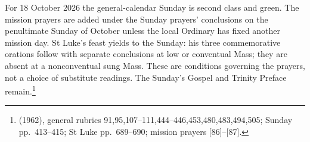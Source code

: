 For 18 October 2026 the general-calendar Sunday is second class and green.
The mission prayers are added under the Sunday prayers' conclusions on
the penultimate Sunday of October unless the local Ordinary has fixed
another mission day. St Luke's feast yields to the Sunday: his three
commemorative orations follow with separate conclusions at low or
conventual Mass; they are absent at a nonconventual sung Mass. These are
conditions governing the prayers, not a choice of substitute readings.
The Sunday's Gospel and Trinity Preface remain.\footnote{ (1962), general rubrics 91,95,107--111,444--446,453,480,483,494,505;
Sunday pp.~413--415; St Luke pp.~689--690; mission prayers [86]--[87].}

\clearpage
